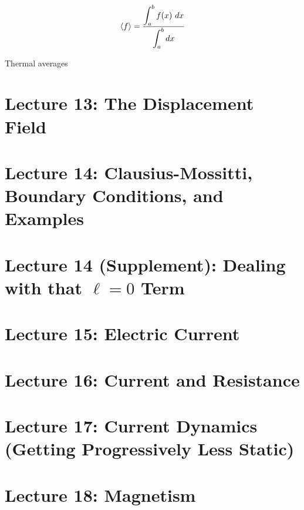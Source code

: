 \documentclass{article}
\numberwithin{equation}{section}
\begin{document}
\begin{equation*}
    \Braket{f} = \frac{\displaystyle \int_a^b f(x)\ dx}{\displaystyle \int_a^b dx}
\end{equation*}

Thermal averages 

\newpage

\section*{Lecture 13: The Displacement Field}
\setcounter{page}{1}


\newpage

\section*{Lecture 14: Clausius-Mossitti, Boundary Conditions, and Examples}
\setcounter{page}{1}


\newpage

\section*{Lecture 14 (Supplement): Dealing with that $\ell = 0$ Term}
\setcounter{page}{1}


\newpage

\section*{Lecture 15: Electric Current}
\setcounter{page}{1}


\newpage

\section*{Lecture 16: Current and Resistance}
\setcounter{page}{1}


\newpage

\section*{Lecture 17: Current Dynamics (Getting Progressively Less Static)}
\setcounter{page}{1}


\newpage

\section*{Lecture 18: Magnetism}
\setcounter{page}{1}


\newpage
\end{document}
